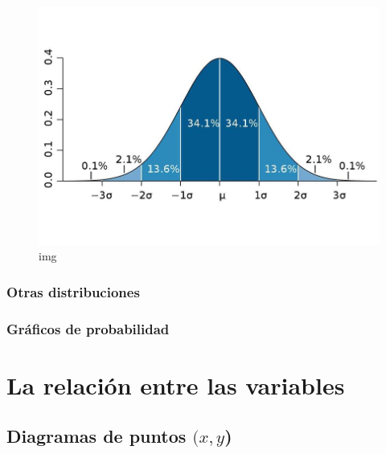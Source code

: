 \documentclass[
  letterpaper,
  DIV=11,
  numbers=noendperiod,
  oneside]{scrreprt}
\begin{document}
\begin{figure}

{\centering \includegraphics{01-imagenes/curva-normal.jpg}

}

\caption{img}

\end{figure}

\hypertarget{otras-distribuciones}{%
\subsection{Otras distribuciones}\label{otras-distribuciones}}

\hypertarget{gruxe1ficos-de-probabilidad}{%
\subsection{Gráficos de
probabilidad}\label{gruxe1ficos-de-probabilidad}}


\hypertarget{la-relaciuxf3n-entre-las-variables}{%
\chapter{La relación entre las
variables}\label{la-relaciuxf3n-entre-las-variables}}

\hypertarget{diagramas-de-puntos-xy}{%
\section{\texorpdfstring{Diagramas de puntos
\((x,y\))}{Diagramas de puntos (x,y)}}\label{diagramas-de-puntos-xy}}
\end{document}
